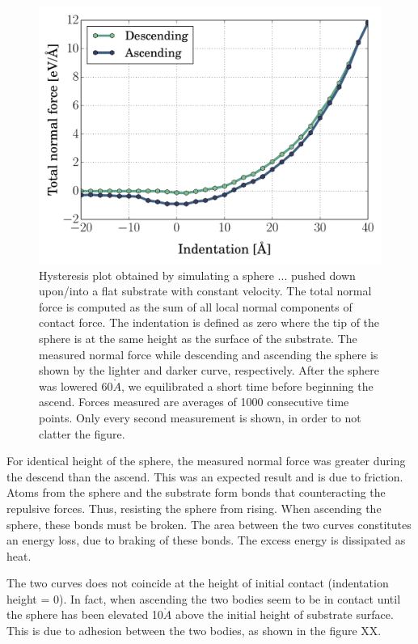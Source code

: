 \documentclass[twoside,english]{uiofysmaster}
\begin{document}
\begin{figure}[H]
\centering
\includegraphics[width=0.7\linewidth]{figures/hysteresis/normal2}
\caption{
	Hysteresis plot obtained by simulating a sphere ... pushed down upon/into a flat substrate with constant velocity. 
	The total normal force is computed as the sum of all local normal components of contact force. The indentation is defined as zero where the tip of the sphere is at the same height as the surface of the substrate.
	The measured normal force while descending and ascending the sphere is shown by the lighter and darker curve, respectively. 
	After the sphere was lowered 60$\mathring{A}$, we equilibrated a short time before beginning the ascend.	
	Forces measured are averages of 1000 consecutive time points.
	Only every second measurement is shown, in order to not clatter the figure.  
	 }
\label{fig:hysteresis}
\end{figure}

\noindent
For identical height of the sphere, the measured normal force was greater during the descend than the ascend. 
This was an expected result and is due to friction. %
Atoms from the sphere and the substrate form bonds that counteracting the repulsive forces. 
Thus, resisting the sphere from rising. 
When ascending the sphere, these bonds must be broken.
The area between the two curves constitutes an energy loss, due to braking of these bonds.
The excess energy is dissipated as heat.

The two curves does not coincide at the height of initial contact (indentation height = 0). 
In fact, when ascending the two bodies seem to be in contact until the sphere has been elevated 10$\mathring{A}$ above the initial height of substrate surface. 
This is due to adhesion between the two bodies, as shown in the figure XX. 
\end{document}
